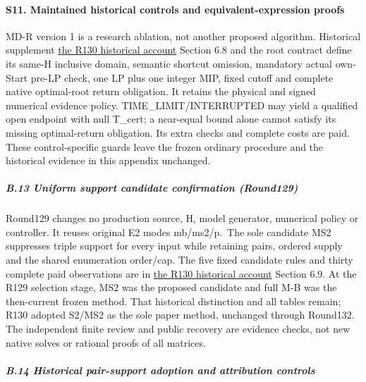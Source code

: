 \documentclass[
  american,
  11pt,
]{article}
\begin{document}
\paragraph{S11. Maintained historical controls and equivalent-expression
proofs}\label{s11.-maintained-historical-controls-and-equivalent-expression-proofs}

MD-R version 1 is a research ablation, not another proposed algorithm.
Historical supplement
\href{https://github.com/yifanXovo/TailoredExact/blob/39043b15b3cceae2cab14a3fbaec39e2b16339ce/results/unified_exact_round130/manuscript.md}{the
R130 historical account} Section 6.8 and the root contract define its
same-H inclusive domain, semantic shortcut omission, mandatory actual
own-Start pre-LP check, one LP plus one integer MIP, fixed cutoff and
complete native optimal-root return obligation. It retains the physical
and signed numerical evidence policy. TIME\_\allowbreak{}LIMIT/INTERRUPTED may yield
a qualified open endpoint with null T\_\allowbreak{}cert; a near-equal bound alone
cannot satisfy its missing optimal-return obligation. Its extra checks
and complete costs are paid. These control-specific guards leave the
frozen ordinary procedure and the historical evidence in this appendix
unchanged.

\subparagraph{B.13 Uniform support candidate confirmation
(Round129)}\label{b.13-uniform-support-candidate-confirmation-round129}

Round129 changes no production source, H, model generator, numerical
policy or controller. It reuses original E2 modes mb/ms2/p.~The sole
candidate MS2 suppresses triple support for every input while retaining
pairs, ordered supply and the shared enumeration order/cap. The five
fixed candidate rules and thirty complete paid observations are in
\href{https://github.com/yifanXovo/TailoredExact/blob/39043b15b3cceae2cab14a3fbaec39e2b16339ce/results/unified_exact_round130/manuscript.md}{the
R130 historical account} Section 6.9. At the R129 selection stage, MS2
was the proposed candidate and full M-B was the then-current frozen
method. That historical distinction and all tables remain; R130 adopted
S2/MS2 as the sole paper method, unchanged through Round132. The
independent finite review and public recovery are evidence checks, not
new native solves or rational proofs of all matrices.

\subparagraph{B.14 Historical pair-support adoption and attribution
controls}\label{b.14-historical-pair-support-adoption-and-attribution-controls}
\end{document}
